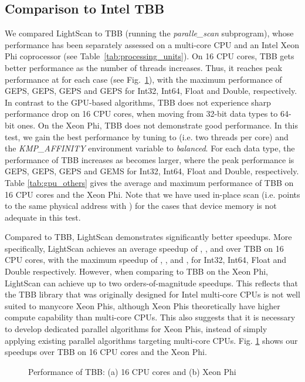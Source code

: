 \documentclass[article]{elsarticle}
\begin{document}
{\subsection{Comparison to Intel TBB}
We compared LightScan to TBB (running the \textit{paralle\_scan} subprogram), whose performance has been separately assessed on a multi-core CPU and an Intel Xeon Phi coprocessor (see Table~\ref{tab:processing_units}). On 16 CPU cores, TBB gets better performance as the number of threads  increases. Thus, it reaches peak performance at  for each case (see Fig.~\ref{fig:tbb}), with the maximum performance of  GEPS,  GEPS,  GEPS and  GEPS for Int32, Int64, Float and Double, respectively. In contrast to the GPU-based algorithms, TBB does not experience sharp performance drop on 16 CPU cores, when moving from 32-bit data types to 64-bit ones. On the Xeon Phi, TBB does not demonstrate good performance. In this test, we gain the best performance by tuning  to  (i.e. two threads per core) and the \textit{KMP\_AFFINITY} environment variable to \textit{balanced}. For each data type, the performance of TBB increases as  becomes larger, where the peak performance is  GEPS,  GEPS,  GEPS and  GEMS for Int32, Int64, Float and Double, respectively. Table \ref{tab:gpu_others} gives the average and maximum performance of TBB on 16 CPU cores and the Xeon Phi. Note that we have used in-place scan (i.e.  points to the same physical address with ) for the cases that device memory is not adequate in this test.

Compared to TBB, LightScan demonstrates significantly better speedups. More specifically, LightScan achieves an average speedup of , ,  and  over TBB on 16 CPU cores, with the maximum speedup of , ,  and , for Int32, Int64, Float and Double respectively. However, when comparing to TBB on the Xeon Phi, LightScan can achieve up to two orders-of-magnitude speedups. This reflects that the TBB library that was originally designed for Intel multi-core CPUs is not well suited to manycore Xeon Phis, although Xeon Phis theoretically have higher compute capability than multi-core CPUs. This also suggests that it is necessary to develop dedicated parallel algorithms for Xeon Phis, instead of simply applying existing parallel algorithms targeting multi-core CPUs. Fig. \ref{fig:tbb} shows our speedups over TBB on 16 CPU cores and the Xeon Phi.
\begin{figure}[!h]
\centering
\begin{minipage}[b]{0.49\linewidth}
\end{minipage}
\begin{minipage}[b]{0.49\linewidth}
\end{minipage}
\caption{Performance of TBB: (a) 16 CPU cores and (b) Xeon Phi}
\label{fig:tbb}
\end{figure}
}
\end{document}
